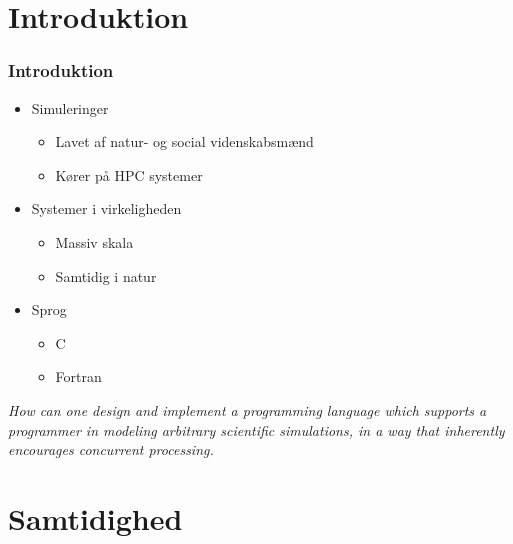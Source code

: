 \section{Introduktion}
\begin{frame}
  \frametitle{Introduktion}
  \begin{itemize}
    \item Simuleringer
    \begin{itemize}
      \item Lavet af natur- og social videnskabsmænd
      \item Kører på HPC systemer
    \end{itemize}
    \item Systemer i virkeligheden
    \begin{itemize}
      \item Massiv skala
      \item Samtidig i natur
    \end{itemize}
    \item Sprog
    \begin{itemize}
      \item C
      \item Fortran
    \end{itemize}
  \end{itemize}
	\emph{How can one design and implement a programming language which supports a
programmer in modeling arbitrary scientific simulations, in a way that inherently
encourages concurrent processing.}
\end{frame}

\section{Samtidighed}
